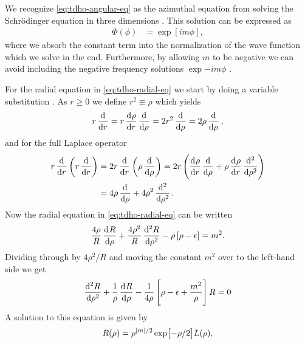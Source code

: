         We recognize \autoref{eq:tdho-angular-eq} as the azimuthal equation from
        solving the Schrödinger equation in three dimensions
        \cite{griffiths2017introduction}.
        This solution can be expressed as
        \begin{align}
            \Phi(\phi) &= \exp[im\phi],
        \end{align}
        where we absorb the constant term into the normalization of the wave
        function which we solve in the end.
        Furthermore, by allowing $m$ to be negative we can avoid including the
        negative frequency solutions $\exp{-im\phi}$
        \cite{griffiths2017introduction}.

        For the radial equation in \autoref{eq:tdho-radial-eq} we start by doing
        a variable substitution \cite{439282}.
        As $r \geq 0$ we define $r^2 \equiv \rho$ which yields
        \begin{align}
            r\dod{}{r} = r\dod{\rho}{r}\dod{}{\rho}
            = 2r^2\dod{}{\rho}
            = 2\rho\dod{}{\rho},
        \end{align}
        and for the full Laplace operator
        \begin{align}
            r\dod{}{r}\para{r \dod{}{r}}
            &= 2r\dod{}{r}\para{\rho\dod{}{\rho}}
            = 2r\para{
                \dod{\rho}{r}\dod{}{\rho}
                + \rho\dod{\rho}{r}\dod[2]{}{\rho}
            }
            \\
            &= 4\rho\dod{}{\rho} + 4\rho^2\dod[2]{}{\rho}.
        \end{align}
        Now the radial equation in \autoref{eq:tdho-radial-eq} can be written
        \begin{align}
            \frac{4\rho}{R}\dod{R}{\rho}
            + \frac{4\rho^2}{R}\dod[2]{R}{\rho}
            - \rho\brak{
                \rho - \epsilon
            } = m^2.
        \end{align}
        Dividing through by $4\rho^2/R$ and moving the constant $m^2$ over to
        the left-hand side we get
        \begin{align}
            \dod[2]{R}{\rho}
            + \frac{1}{\rho}\dod{R}{\rho}
            - \frac{1}{4\rho}\brak{
                \rho
                - \epsilon
                + \frac{m^2}{\rho}
            }R = 0
            \label{eq:tdho-radial-sub}
        \end{align}
        A solution to this equation is given by \cite{439282,
        sandev2005selection}
        \begin{align}
            R(\rho)
            = \rho^{\abs{m}/2}
            \exp[-\rho/2]
            L(\rho),
        \end{align}
